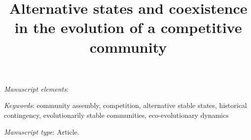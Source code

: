 \documentclass[11pt]{article}
\title{Alternative states and coexistence in the evolution of a competitive community}
\author{}
\date{}
\begin{document}
\maketitle


%

\bigskip

\textit{Manuscript elements}: %

\bigskip


\textit{Keywords}: {
community assembly,
competition,
alternative stable states,
historical contingency,
evolutionarily stable communities,
eco-evolutionary dynamics}


\bigskip

\textit{Manuscript type}: Article.

\bigskip


\linenumbers{}
\modulolinenumbers[3]

\newpage{}





\newpage{}









\end{document}
